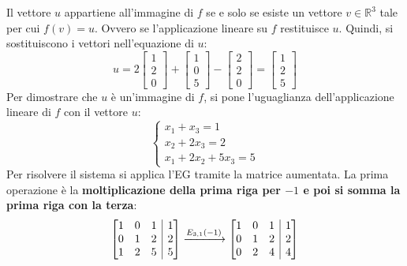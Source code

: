 \documentclass[a4paper]{article}
\makeatletter
\newenvironment{rowequmatbra}[1]{\left[\array{@{}#1@{}}}{\endarray\right]}
\makeatother
\begin{document}
	\noindent
	Il vettore $u$ appartiene all'immagine di $f$ se e solo se esiste un vettore $v \in \mathbb{R}^{3}$ tale per cui $f\left(v\right) = u$. Ovvero se l'applicazione lineare su $f$ restituisce $u$. Quindi, si sostituiscono i vettori nell'equazione di $u$:
	\begin{equation*}
		u = 2\begin{bmatrix}
			1 \\
			2 \\
			0
		\end{bmatrix} + \begin{bmatrix}
			1 \\
			0 \\
			5
		\end{bmatrix} - \begin{bmatrix}
			2 \\
			2 \\
			0
		\end{bmatrix} = \begin{bmatrix}
			1 \\
			2 \\
			5	
		\end{bmatrix}
	\end{equation*}
	Per dimostrare che $u$ è un'immagine di $f$, si pone l'uguaglianza dell'applicazione lineare di $f$ con il vettore $u$:
	\begin{equation*}
		\begin{cases}
			x_{1} + x_{3} = 1 \\
			x_{2} + 2x_{3} = 2 \\
			x_{1} + 2x_{2} + 5x_{3} = 5
		\end{cases}
	\end{equation*}
	Per risolvere il sistema si applica l'EG tramite la matrice aumentata. La prima operazione è la \textbf{moltiplicazione della prima riga per $-1$ e poi si somma la prima riga con la terza}:
	\begin{equation*}
		\begin{rowequmatbra}{ccc|c}
			1 & 0 & 1 & 1 \\
			0 & 1 & 2 & 2 \\
			1 & 2 & 5 & 5
		\end{rowequmatbra}
		\xlongrightarrow{E_{3,1}\left(-1\right)}
		\begin{rowequmatbra}{ccc|c}
			1 & 0 & 1 & 1 \\
			0 & 1 & 2 & 2 \\
			0 & 2 & 4 & 4
		\end{rowequmatbra}
	\end{equation*}
\end{document}

